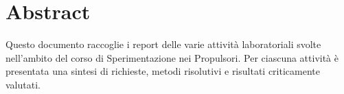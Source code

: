 \section*{Abstract}
\thispagestyle{empty}
Questo documento raccoglie i report delle varie attività laboratoriali svolte nell'ambito del corso di Sperimentazione nei Propulsori. Per ciascuna attività è presentata una sintesi di richieste, metodi risolutivi e risultati criticamente valutati.



